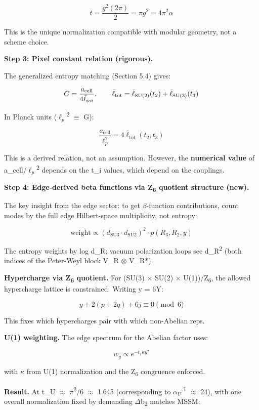 \documentclass[11pt,a4paper]{article}
\theoremstyle{remark}
\begin{document}
\[
t = \frac{g^2(2\pi)}{2} = \pi g^2 = 4\pi^2 \alpha
\]

This is the unique normalization compatible with modular geometry, not a scheme choice.

\textbf{Step 3: Pixel constant relation (rigorous).}

The generalized entropy matching (Section 5.4) gives:

\[
G = \frac{a_\mathrm{cell}}{4\bar{\ell}_\mathrm{tot}}, \qquad
\bar{\ell}_\mathrm{tot} = \bar{\ell}_{\rm SU(2)}(t_2) + \bar{\ell}_{\rm SU(3)}(t_3)
\]

In Planck units ($\ell_p$\textsuperscript{2} \ensuremath{\equiv} G):

\[
\frac{a_\mathrm{cell}}{\ell_p^2} = 4\bar{\ell}_\mathrm{tot}(t_2, t_3)
\]

This is a derived relation, not an assumption. However, the \textbf{numerical value} of a\_cell/$\ell_p$\textsuperscript{2} depends on the t\_i values, which depend on the couplings.

\textbf{Step 4: Edge-derived beta functions via Z\textsubscript{6} quotient structure (new).}

The key insight from the edge sector: to get \ensuremath{\beta}-function contributions, count modes by the full edge Hilbert-space multiplicity, not entropy:

\[
\text{weight} \propto (d_\mathrm{SU3} \cdot d_\mathrm{SU2})^2 \cdot p(R_3, R_2, y)
\]

The entropy weights by log d\_R; vacuum polarization loops see d\_R\textsuperscript{2} (both indices of the Peter-Weyl block V\_R \ensuremath{\otimes} V\_R*).

\textbf{Hypercharge via Z\textsubscript{6} quotient.} For (SU(3) \ensuremath{\times} SU(2) \ensuremath{\times} U(1))/Z\textsubscript{6}, the allowed hypercharge lattice is constrained. Writing y = 6Y:

\[
y + 2(p + 2q) + 6j \equiv 0 \pmod{6}
\]

This fixes which hypercharges pair with which non-Abelian reps.

\textbf{U(1) weighting.} The edge spectrum for the Abelian factor uses:

\[
w_y \propto e^{-t_1 \kappa y^2}
\]

with \ensuremath{\kappa} from U(1) normalization and the Z\textsubscript{6} congruence enforced.

\textbf{Result.} At t\_U \ensuremath{\approx} \ensuremath{\pi}\textsuperscript{2}/6 \ensuremath{\approx} 1.645 (corresponding to $\alpha_U$\textsuperscript{-1} \ensuremath{\approx} 24), with one overall normalization fixed by demanding \ensuremath{\Delta}b\textsubscript{2} matches MSSM:
\end{document}
